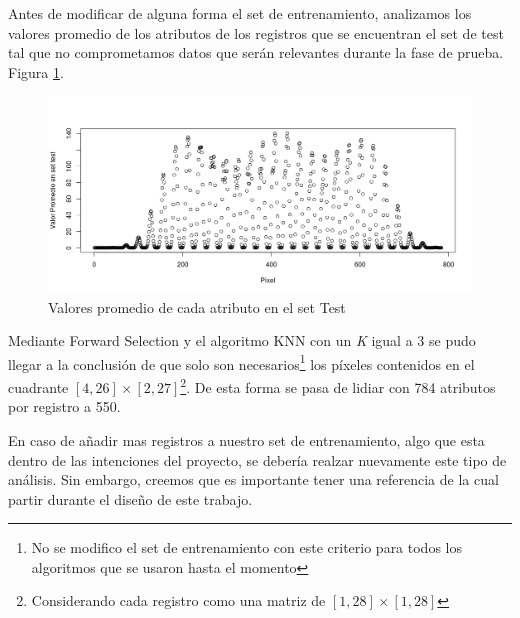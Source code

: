 Antes de modificar de alguna forma el set de entrenamiento, analizamos los valores promedio de los atributos de los registros que se encuentran el set de test tal que no comprometamos datos que serán relevantes durante la fase de prueba. Figura \ref{plot2}.

\begin{figure}[htp]
  \begin{center}
    \includegraphics[width=15cm]{Rplot01.jpeg}
    \caption{Valores promedio de cada atributo en el set Test}
    \label{plot2}
  \end{center}
\end{figure}

Mediante Forward Selection y el algoritmo KNN con un \textit{K} igual a 3 se pudo llegar a la conclusión de que solo son necesarios\footnote{No se modifico el set de entrenamiento con este criterio para todos los algoritmos que se usaron hasta el momento} los píxeles contenidos en el cuadrante $ [4,26]\times[2,27] $\footnote{Considerando cada registro como una matriz de $ [1,28]\times[1,28] $}. De esta forma se pasa de lidiar con 784 atributos por registro a 550.

En caso de añadir mas registros a nuestro set de entrenamiento, algo que esta dentro de las intenciones del proyecto, se debería realzar nuevamente este tipo de análisis. Sin embargo, creemos que es importante tener una referencia de la cual partir durante el diseño de este trabajo.
